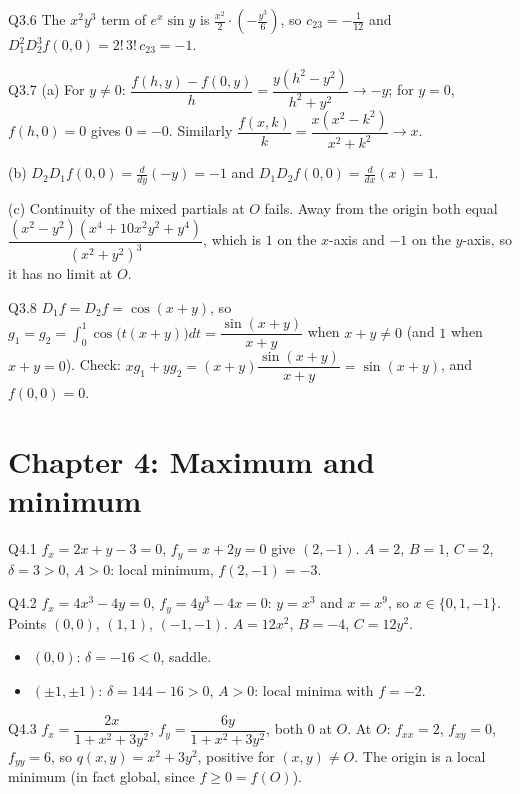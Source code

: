 \begin{solution}{Q3.6}
The $x^2y^3$ term of $e^x\sin y$ is $\tfrac{x^2}{2}\cdot\left(-\tfrac{y^3}{6}\right)$, so $c_{23}=-\tfrac1{12}$
and $D_1^2D_2^3f(0,0)=2!\,3!\,c_{23}=-1$.
\end{solution}

\begin{solution}{Q3.7}
(a) For $y\neq0$: $\dfrac{f(h,y)-f(0,y)}{h}=\dfrac{y(h^2-y^2)}{h^2+y^2}\to-y$; for $y=0$, $f(h,0)=0$ gives
$0=-0$. Similarly $\dfrac{f(x,k)}{k}=\dfrac{x(x^2-k^2)}{x^2+k^2}\to x$.

(b) $D_2D_1f(0,0)=\frac{d}{dy}(-y)=-1$ and $D_1D_2f(0,0)=\frac{d}{dx}(x)=1$.

(c) Continuity of the mixed partials at $O$ fails. Away from the origin both equal
$\dfrac{(x^2-y^2)(x^4+10x^2y^2+y^4)}{(x^2+y^2)^3}$, which is $1$ on the $x$-axis and $-1$ on the
$y$-axis, so it has no limit at $O$.
\end{solution}

\begin{solution}{Q3.8}
$D_1f=D_2f=\cos(x+y)$, so $g_1=g_2=\int_0^1\cos\big(t(x+y)\big)dt=\dfrac{\sin(x+y)}{x+y}$ when
$x+y\neq0$ (and $1$ when $x+y=0$). Check: $xg_1+yg_2=(x+y)\dfrac{\sin(x+y)}{x+y}=\sin(x+y)$, and
$f(0,0)=0$.
\end{solution}

\section{Chapter 4: Maximum and minimum}

\begin{solution}{Q4.1}
$f_x=2x+y-3=0$, $f_y=x+2y=0$ give $(2,-1)$. $A=2$, $B=1$, $C=2$, $\delta=3>0$, $A>0$: local minimum,
$f(2,-1)=-3$.
\end{solution}

\begin{solution}{Q4.2}
$f_x=4x^3-4y=0$, $f_y=4y^3-4x=0$: $y=x^3$ and $x=x^9$, so $x\in\{0,1,-1\}$. Points $(0,0)$, $(1,1)$,
$(-1,-1)$. $A=12x^2$, $B=-4$, $C=12y^2$.
\begin{itemize}
  \item $(0,0)$: $\delta=-16<0$, saddle.
  \item $(\pm1,\pm1)$: $\delta=144-16>0$, $A>0$: local minima with $f=-2$.
\end{itemize}
\end{solution}

\begin{solution}{Q4.3}
$f_x=\dfrac{2x}{1+x^2+3y^2}$, $f_y=\dfrac{6y}{1+x^2+3y^2}$, both $0$ at $O$. At $O$: $f_{xx}=2$, $f_{xy}=0$,
$f_{yy}=6$, so $q(x,y)=x^2+3y^2$, positive for $(x,y)\neq O$. The origin is a local minimum (in fact
global, since $f\ge0=f(O)$).
\end{solution}

